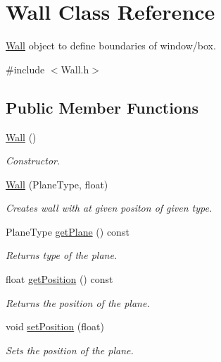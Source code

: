 \hypertarget{class_wall}{\section{Wall Class Reference}
\label{class_wall}
}


\hyperlink{class_wall}{Wall} object to define boundaries of window/box.  




{\ttfamily \#include $<$Wall.\-h$>$}

\subsection*{Public Member Functions}
\begin{DoxyCompactItemize}
\item 
\hypertarget{class_wall_a12dc41bc7bc045c55ec1034a43e52043}{\hyperlink{class_wall_a12dc41bc7bc045c55ec1034a43e52043}{Wall} ()}\label{class_wall_a12dc41bc7bc045c55ec1034a43e52043}

\begin{DoxyCompactList}\small\item\em Constructor. \end{DoxyCompactList}\item 
\hypertarget{class_wall_ae4f555d738a794750a3a3eee13224aa6}{\hyperlink{class_wall_ae4f555d738a794750a3a3eee13224aa6}{Wall} (Plane\-Type, float)}\label{class_wall_ae4f555d738a794750a3a3eee13224aa6}

\begin{DoxyCompactList}\small\item\em Creates wall with at given positon of given type. \end{DoxyCompactList}\item 
\hypertarget{class_wall_a5078f7c871c757e37d3604dc91194058}{Plane\-Type \hyperlink{class_wall_a5078f7c871c757e37d3604dc91194058}{get\-Plane} () const }\label{class_wall_a5078f7c871c757e37d3604dc91194058}

\begin{DoxyCompactList}\small\item\em Returns type of the plane. \end{DoxyCompactList}\item 
\hypertarget{class_wall_aa5842de4210e80f6bd539a3438d76458}{float \hyperlink{class_wall_aa5842de4210e80f6bd539a3438d76458}{get\-Position} () const }\label{class_wall_aa5842de4210e80f6bd539a3438d76458}

\begin{DoxyCompactList}\small\item\em Returns the position of the plane. \end{DoxyCompactList}\item 
\hypertarget{class_wall_add5e93f662291366050b73dec61ac7cf}{void \hyperlink{class_wall_add5e93f662291366050b73dec61ac7cf}{set\-Position} (float)}\label{class_wall_add5e93f662291366050b73dec61ac7cf}

\begin{DoxyCompactList}\small\item\em Sets the position of the plane. \end{DoxyCompactList}\end{DoxyCompactItemize}


